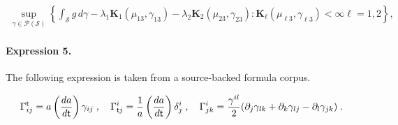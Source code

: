 \documentclass[11pt]{article}
\begin{document}
\begin{align*} \sup_{\gamma \in \mathcal{P}(\mathcal{S})} \left\{\int_{\mathcal{S}} g \, d \gamma - \lambda_1 \boldsymbol{K}_1(\mu_{13}, \gamma_{13}) - \lambda_2 \boldsymbol{K}_2(\mu_{23}, \gamma_{23}): \boldsymbol{K}_\ell(\mu_{\ell3}, \gamma_{\ell3}) < \infty \ell = 1, 2\right\}, \end{align*}

\paragraph{Expression 5.} The following expression is taken from a source-backed formula corpus.

\begin{align*} \Gamma^{\sf t}_{ij} = a\left(\frac{da}{d{\sf t}}\right)\gamma_{ij}\;, ~~~\Gamma^{i}_{{\sf t}j} = \frac{1}{a}\left(\frac{da}{d{\sf t}}\right)\delta^i_j \;,~~~\Gamma^{i}_{jk}=\frac{\gamma^{il}}{2}(\partial_j\gamma_{lk}+\partial_k \gamma_{lj}-\partial_l\gamma_{jk}) \;.\end{align*}
\end{document}
